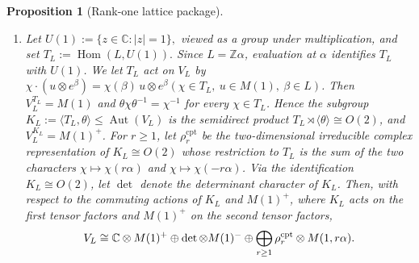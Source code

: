 \documentclass[10pt,a4paper]{amsart}
\numberwithin{equation}{section} \newtheorem{thm}{Theorem}[section] \newtheorem{lem}[thm]{Lemma} \newtheorem{ex}[thm]{Example} \newtheorem{prop}[thm]{Proposition} \newtheorem{cor}[thm]{Corollary} \newtheorem{defi}[thm]{Definition} \newtheorem{rmk}[thm]{Remark} \newtheorem{notation}[thm]{Notation}
\newcommand{\Aut}{\operatorname{Aut}}
\newcommand{\Hom}{\operatorname{Hom}}
\begin{document}
\begin{prop}[Rank-one lattice package]
\begin{enumerate}[label=\textnormal{(\roman*)}]
\item Let
$ U(1):=\{z\in\mathbb C:|z|=1\}, $ viewed as a group under multiplication, and set $ T_L:=\Hom(L,U(1)). $ Since $L=\mathbb Z\alpha$, evaluation at $\alpha$ identifies $T_L$ with $U(1)$. We let $T_L$ act on $V_L$ by \(\chi\cdot(u\otimes e^\beta) =\chi(\beta)\,u\otimes e^\beta (\chi\in T_L,\ u\in M(1),\ \beta\in L)\). Then $V_L^{T_L}=M(1)$ and $\theta\chi\theta^{-1}=\chi^{-1}$ for every $\chi\in T_L$. Hence the subgroup \(K_L:=\langle T_L,\theta\rangle\le\Aut(V_L)\) is the semidirect product $T_L\rtimes\langle\theta\rangle\cong O(2)$, and $V_L^{K_L}=M(1)^+$. For $r\ge1$, let $\rho_r^{\mathrm{cpt}}$ be the two-dimensional irreducible complex representation of $K_L\cong O(2)$ whose restriction to $T_L$ is the sum of the two characters $\chi\mapsto\chi(r\alpha)$ and $\chi\mapsto\chi(-r\alpha)$. Via the identification \(K_L\cong O(2)\), let \(\det\) denote the determinant character of \(K_L\). Then, with respect to the commuting actions of \(K_L\) and \(M(1)^+\), where \(K_L\) acts on the first tensor factors and \(M(1)^+\) on the second tensor factors,
\begin{equation}\label{eq:rank-one-O2-Schur-Weyl}
V_L\cong
\C\otimes M(1)^+
\oplus\det\otimes M(1)^-
\oplus\bigoplus_{r\ge1}
\rho_r^{\mathrm{cpt}}\otimes M(1,r\alpha).
\end{equation}
\end{enumerate}
\end{prop}
\end{document}
